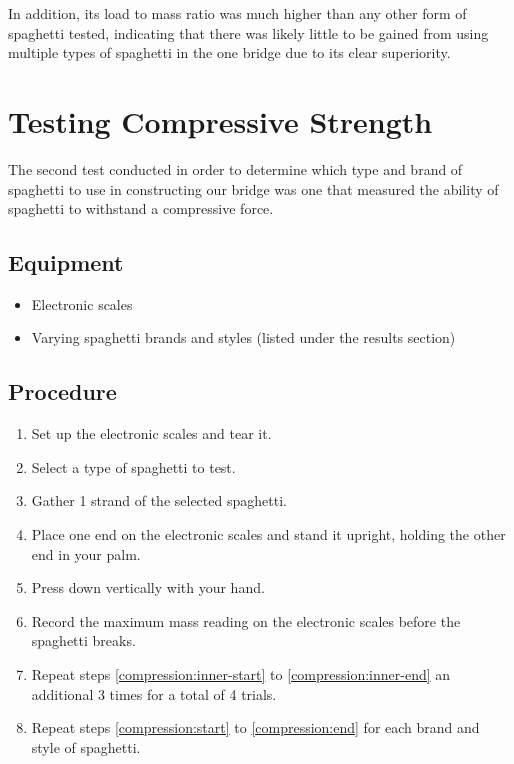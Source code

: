 \documentclass[a4paper,11pt]{article}
\begin{document}
In addition, its load to mass ratio was much higher than any other form of
spaghetti tested, indicating that there was likely little to be gained from
using multiple types of spaghetti in the one bridge due to its clear
superiority.




\section{Testing Compressive Strength}

The second test conducted in order to determine which type and brand of
spaghetti to use in constructing our bridge was one that measured the ability
of spaghetti to withstand a compressive force.


\subsection{Equipment}

\begin{itemize}
\item Electronic scales
\item Varying spaghetti brands and styles (listed under the results section)
\end{itemize}


\subsection{Procedure}

\begin{enumerate}
\item Set up the electronic scales and tear it.
\item \label{compression:start} Select a type of spaghetti to test.
\item \label{compression:inner-start} Gather 1 strand of the selected spaghetti.
\item Place one end on the electronic scales and stand it upright, holding the
	other end in your palm.
\item Press down vertically with your hand.
\item \label{compression:inner-end} Record the maximum mass reading on the
	electronic scales before the spaghetti breaks.
\item \label{compression:end} Repeat steps \ref{compression:inner-start} to
	\ref{compression:inner-end} an additional 3 times for a total of 4 trials.
\item Repeat steps \ref{compression:start} to \ref{compression:end} for each
	brand and style of spaghetti.
\end{enumerate}
\end{document}
